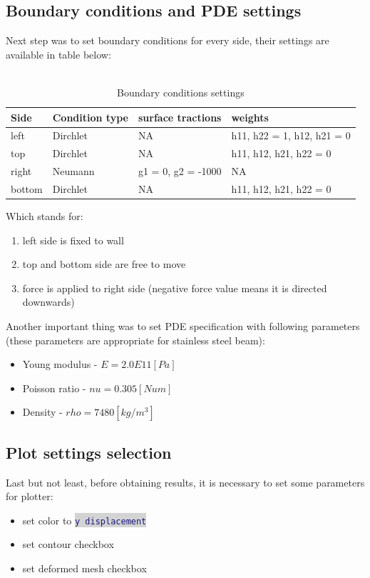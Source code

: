 \documentclass[onecolumn]{article}
\newcommand{\inlinecode}[2]{\colorbox{lightgray}{\lstinline[language=#1]$#2$}}
\begin{document}
\subsection{Boundary conditions and PDE settings}
Next step was to set boundary conditions for every side, their settings are available in table below: \\
\\
\begin{table}[H]
\centering
\begin{tabular}{|l|l|l|l|}
\hline 
Side  & Condition type & surface tractions & weights \\ \hline 
left  & Dirchlet & NA & h11, h22 = 1, h12, h21 = 0 \\ \hline 
top   & Dirchlet & NA & h11, h12, h21, h22 = 0 \\ \hline
right & Neumann  & g1 = 0, g2 = -1000 & NA \\ \hline
bottom   & Dirchlet & NA & h11, h12, h21, h22 = 0 \\ \hline

\end{tabular}
\caption{Boundary conditions settings}
\end{table}
Which stands for:
\begin{enumerate}
    \item left side is fixed to wall
    \item top and bottom side are free to move
    \item force is applied to right side (negative force value means it is directed downwards)
\end{enumerate}
Another important thing was to set PDE specification with following parameters (these parameters are appropriate for stainless steel beam):
\begin{itemize}
    \item Young modulus - $E = 2.0E11 [Pa]$
    \item Poisson ratio - $nu = 0.305 [Num]$
    \item Density - $rho = 7480 [kg/m^3]$
\end{itemize}

\subsection{Plot settings selection}
Last but not least, before obtaining results, it is necessary to set some parameters for plotter:
\begin{itemize}
    \item set color to \inlinecode{matlab}{y displacement}
    \item set contour checkbox
    \item set deformed mesh checkbox
\end{itemize}
\end{document}
